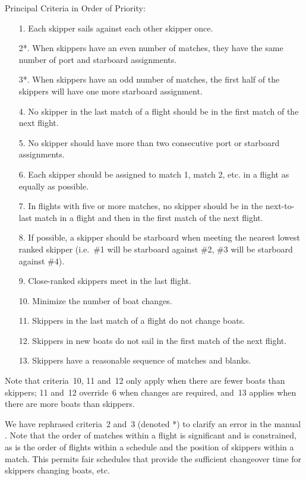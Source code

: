 \documentclass{llncs}
\begin{document}
\begin{framed}
\noindent Principal Criteria in Order of Priority:
\begin{enumerate}
\item[1.] Each skipper sails against each other skipper once.
\item[2*.] When skippers have an even number of matches, they have the same number of port and starboard
    assignments.
\item[3*.] When skippers have an odd number of matches, the first half of the skippers will have one
    more starboard assignment.
\item[4.] No skipper in the last match of a flight should be in the first match of the next flight.
\item[5.] No skipper should have more than two consecutive port or starboard assignments.
\item[6.] Each skipper should be assigned to match 1, match 2, etc. in a flight as equally as possible.
\item[7.] In flights with five or more matches, no skipper should be in the next-to-last match in a
    flight and then in the first match of the next flight.
\item[8.] If possible, a skipper should be starboard when meeting the nearest lowest ranked skipper
    (i.e.\ \#1 will be starboard against \#2, \#3 will be starboard against \#4).
\item[9.] Close-ranked skippers meet in the last flight.
\item[10.] Minimize the number of boat changes.
\item[11.] Skippers in the last match of a flight do not change boats.
\item[12.] Skippers in new boats do not sail in the first match of the next flight.
\item[13.] Skippers have a reasonable sequence of matches and blanks.
\end{enumerate}
Note that criteria~10, 11 and~12 only apply when there are fewer boats than skippers; 11 and~12
override~6 when changes are required, and~13 applies when there are more boats than skippers.
\end{framed}

We have rephrased criteria~2 and~3 (denoted *) to clarify an error in the manual \cite{isaf}. Note
that the order of matches within a flight is significant and is constrained, as is the order of
flights within a schedule and the position of skippers within a match. This permits fair schedules
that provide the sufficient changeover time for skippers changing boats, etc.
\end{document}
